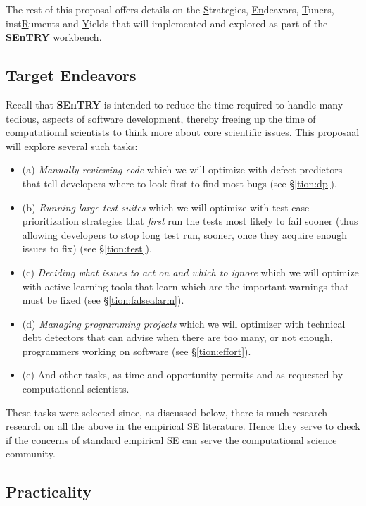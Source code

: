 \documentclass{NSF}
\newenvironment{myitemize}
{ \begin{itemize}
    \setlength{\itemsep}{0pt}
    \setlength{\parskip}{0pt}
    \setlength{\parsep}{0pt}     }
{ \end{itemize}                  }
\newcommand{\bi}{\begin{myitemize}}
\newcommand{\ei}{\end{myitemize}}
\newcommand{\tion}[1]{\S\ref{tion:#1}}
\newcommand{\IT}{{\bf {\sffamily SEnTRY}}}
\begin{document}
\begin{nsfdescription}
The rest of this proposal offers details  on the 
\underline{S}trategies, \underline{En}deavors, 
\underline{T}uners,
inst\underline{R}uments and \underline{Y}ields
that will implemented and explored as part
of the {\IT} workbench. 

\subsection{Target Endeavors}\label{tion:ende}

Recall that {\IT} is intended to reduce the
time required to handle  many  tedious,
aspects of software development, thereby  freeing up the time of computational scientists to think
more about core scientific issues. This proposaal will explore
several  such tasks:
\bi
\item[(a)] 
{\em Manually reviewing code} which we will optimize with defect predictors that tell developers where to look first to find most bugs (see \tion{dp}).
\item[(b)] {\em Running large test suites}
which we will optimize with test case prioritization
strategies that {\em first} run the tests
most likely to fail  sooner (thus allowing developers to stop long test run, sooner, once they acquire   enough issues to fix)
(see \tion{test}).
\item[(c)]  {\em Deciding what issues to act on  and which to 
ignore} which we will optimize with 
active learning tools that learn which are the important warnings that must be fixed
(see \tion{falsealarm}).
\item [(d)] {\em Managing programming projects}
which we will optimizer with technical debt detectors
that can advise when there are too many, or not enough, programmers working on software
(see \tion{effort}).
\item[(e)] And other tasks, as time and opportunity permits and as requested by   computational
scientists.
\ei
These tasks were selected since, as discussed below, there is much research research on all the above in the empirical SE literature. Hence they serve to check if the concerns of standard
empirical SE can serve the computational science community.
 
 \subsection{Practicality}\label{tion:practical}


\end{nsfdescription}
\end{document}
